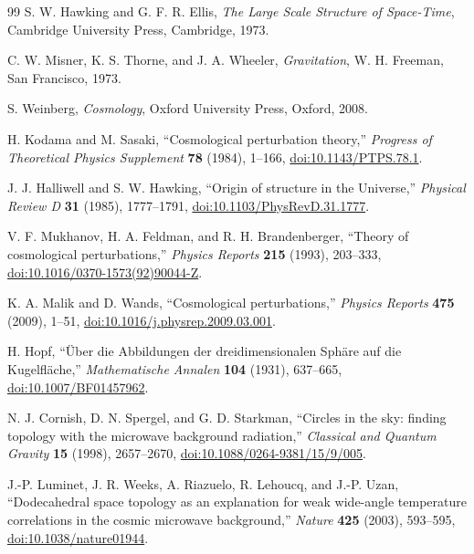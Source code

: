 \documentclass[11pt,a4paper]{article}
\numberwithin{equation}{section}
\theoremstyle{remark}
\begin{document}
\begin{thebibliography}{99}
S. W. Hawking and G. F. R. Ellis, \emph{The Large Scale Structure of Space-Time}, Cambridge University Press, Cambridge, 1973.

C. W. Misner, K. S. Thorne, and J. A. Wheeler, \emph{Gravitation}, W. H. Freeman, San Francisco, 1973.

S. Weinberg, \emph{Cosmology}, Oxford University Press, Oxford, 2008.

H. Kodama and M. Sasaki, ``Cosmological perturbation theory,'' \emph{Progress of Theoretical Physics Supplement} \textbf{78} (1984), 1--166, \href{https://doi.org/10.1143/PTPS.78.1}{doi:10.1143/PTPS.78.1}.

J. J. Halliwell and S. W. Hawking, ``Origin of structure in the Universe,'' \emph{Physical Review D} \textbf{31} (1985), 1777--1791, \href{https://doi.org/10.1103/PhysRevD.31.1777}{doi:10.1103/PhysRevD.31.1777}.

V. F. Mukhanov, H. A. Feldman, and R. H. Brandenberger, ``Theory of cosmological perturbations,'' \emph{Physics Reports} \textbf{215} (1993), 203--333, \href{https://doi.org/10.1016/0370-1573(92)90044-Z}{doi:10.1016/0370-1573(92)90044-Z}.

K. A. Malik and D. Wands, ``Cosmological perturbations,'' \emph{Physics Reports} \textbf{475} (2009), 1--51, \href{https://doi.org/10.1016/j.physrep.2009.03.001}{doi:10.1016/j.physrep.2009.03.001}.

H. Hopf, ``\"Uber die Abbildungen der dreidimensionalen Sph\"are auf die Kugelfl\"ache,'' \emph{Mathematische Annalen} \textbf{104} (1931), 637--665, \href{https://doi.org/10.1007/BF01457962}{doi:10.1007/BF01457962}.

N. J. Cornish, D. N. Spergel, and G. D. Starkman, ``Circles in the sky: finding topology with the microwave background radiation,'' \emph{Classical and Quantum Gravity} \textbf{15} (1998), 2657--2670, \href{https://doi.org/10.1088/0264-9381/15/9/005}{doi:10.1088/0264-9381/15/9/005}.

J.-P. Luminet, J. R. Weeks, A. Riazuelo, R. Lehoucq, and J.-P. Uzan, ``Dodecahedral space topology as an explanation for weak wide-angle temperature correlations in the cosmic microwave background,'' \emph{Nature} \textbf{425} (2003), 593--595, \href{https://doi.org/10.1038/nature01944}{doi:10.1038/nature01944}.


\end{thebibliography}
\end{document}
